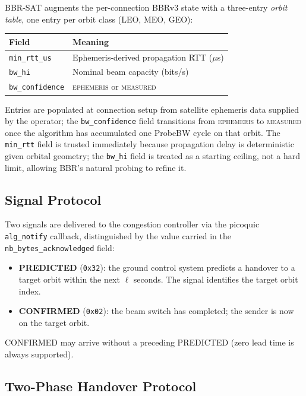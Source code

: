 \documentclass[conference]{IEEEtran}
\begin{document}
BBR-SAT augments the per-connection BBRv3 state with a three-entry
\emph{orbit table}, one entry per orbit class (LEO, MEO, GEO):

\begin{center}
\small
\setlength{\tabcolsep}{4pt}
\begin{tabular}{ll}
\toprule
Field & Meaning \\
\midrule
\texttt{min\_rtt\_us}   & Ephemeris-derived propagation RTT ($\mu$s) \\
\texttt{bw\_hi}         & Nominal beam capacity (bits/s) \\
\texttt{bw\_confidence} & \textsc{ephemeris} or \textsc{measured} \\
\bottomrule
\end{tabular}
\end{center}

Entries are populated at connection setup from satellite ephemeris data
supplied by the operator; the \texttt{bw\_confidence} field transitions
from \textsc{ephemeris} to \textsc{measured} once the algorithm has
accumulated one ProbeBW cycle on that orbit.
The \texttt{min\_rtt} field is trusted immediately because propagation delay
is deterministic given orbital geometry; the \texttt{bw\_hi} field is
treated as a starting ceiling, not a hard limit, allowing BBR's natural
probing to refine it.

\subsection{Signal Protocol}

Two signals are delivered to the congestion controller via the picoquic
\texttt{alg\_notify} callback, distinguished by the value carried in the
\texttt{nb\_bytes\_acknowledged} field:

\begin{itemize}
  \item \textbf{PREDICTED} (\texttt{0x32}): the ground control system
        predicts a handover to a target orbit within the next $\ell$ seconds.
        The signal identifies the target orbit index.
  \item \textbf{CONFIRMED} (\texttt{0x02}): the beam switch has completed;
        the sender is now on the target orbit.
\end{itemize}

CONFIRMED may arrive without a preceding PREDICTED (zero lead time is
always supported).

\subsection{Two-Phase Handover Protocol}
\end{document}
